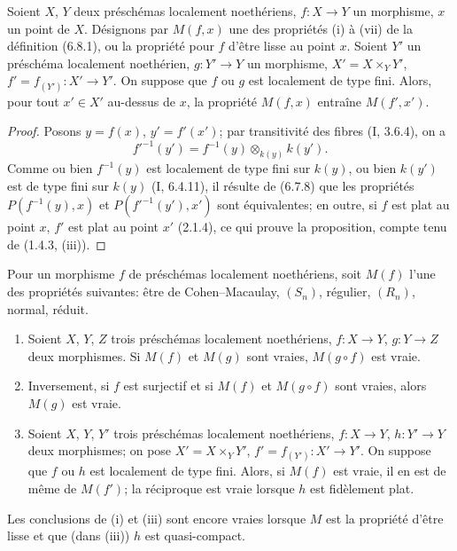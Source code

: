 \begin{proposition}[6.8.2]
\label{IV.2.s6.8.2-fr}
Soient $X$, $Y$ deux préschémas localement noethériens, $f:X\to Y$ un
morphisme, $x$ un point de $X$. Désignons par $M(f,x)$ une des propriétés
(i) à (vii) de la définition (6.8.1), ou la propriété pour $f$ d'être lisse au
point $x$. Soient $Y'$ un préschéma localement noethérien, $g:Y'\to Y$ un
morphisme, $X'=X\times_Y Y'$, $f'=f_{(Y')}:X'\to Y'$. On suppose que $f$
ou $g$ est localement de type fini. Alors, pour tout $x'\in X'$ au-dessus de
$x$, la propriété $M(f,x)$ entraîne $M(f',x')$.
\end{proposition}

\begin{proof}
Posons $y=f(x)$, $y'=f'(x')$; par transitivité des fibres (I, 3.6.4), on a
\[
f'^{-1}(y')=f^{-1}(y)\otimes_{k(y)}k(y').
\]
Comme ou bien $f^{-1}(y)$ est localement de type fini sur $k(y)$, ou bien
$k(y')$ est de type fini sur $k(y)$ (I, 6.4.11), il résulte de (6.7.8) que
les propriétés $P(f^{-1}(y),x)$ et $P(f'^{-1}(y'),x')$ sont équivalentes; en
outre, si $f$ est plat au point $x$, $f'$ est plat au point $x'$ (2.1.4), ce
qui prouve la proposition, compte tenu de (1.4.3, (iii)).
\end{proof}

\begin{proposition}[6.8.3]
\label{IV.2.s6.8.3-fr}
Pour un morphisme $f$ de préschémas localement noethériens, soit $M(f)$
l'une des propriétés suivantes: être de Cohen--Macaulay, $(S_n)$, régulier,
$(R_n)$, normal, réduit.
\begin{enumerate}
\item[(i)] Soient $X$, $Y$, $Z$ trois préschémas localement noethériens,
$f:X\to Y$, $g:Y\to Z$ deux morphismes. Si $M(f)$ et $M(g)$ sont vraies,
$M(g\circ f)$ est vraie.
\item[(ii)] Inversement, si $f$ est surjectif et si $M(f)$ et $M(g\circ f)$
sont vraies, alors $M(g)$ est vraie.
\item[(iii)] Soient $X$, $Y$, $Y'$ trois préschémas localement noethériens,
$f:X\to Y$, $h:Y'\to Y$ deux morphismes; on pose $X'=X\times_Y Y'$,
$f'=f_{(Y')}:X'\to Y'$. On suppose que $f$ ou $h$ est localement de type
fini. Alors, si $M(f)$ est vraie, il en est de même de $M(f')$; la réciproque
est vraie lorsque $h$ est fidèlement plat.
\end{enumerate}
Les conclusions de (i) et (iii) sont encore vraies lorsque $M$ est la propriété
d'être lisse et que (dans (iii)) $h$ est quasi-compact.
\end{proposition}

